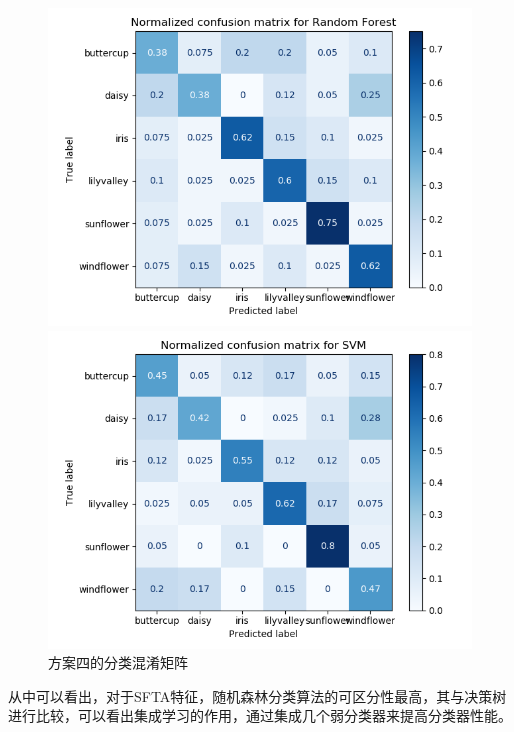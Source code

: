 \documentclass[supercite]{HustGraduPaper}
\begin{document}
\begin{sloppypar}
\begin{figure}[H]
\begin{minipage}[t]{0.32\textwidth}
         \centering
         \includegraphics[scale=0.22]{8.png}
         \end{minipage}
         \begin{minipage}[t]{0.32\textwidth}
          \centering
          \includegraphics[scale=0.22]{9.png}
          \end{minipage}
       \caption{方案四的分类混淆矩阵}
       \end{figure}

       从中可以看出，对于SFTA特征，随机森林分类算法的可区分性最高，其与决策树进行比较，可以看出集成学习的作用，通过集成几个弱分类器来提高分类器性能。

\end{sloppypar}
\end{document}
